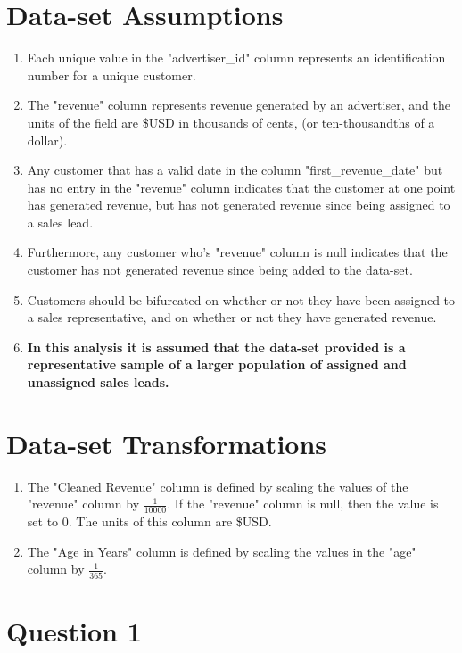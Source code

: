 \documentclass[11pt]{article}
\begin{document}
\section{Data-set Assumptions}
\begin{enumerate}
    \item Each unique value in the "advertiser\_id" column represents an identification number for a unique customer.
    \item The "revenue" column represents revenue generated by an advertiser, and the units of the field are \$USD in thousands of cents, (or ten-thousandths of a dollar).
    \item Any customer that has a valid date in the column "first\_revenue\_date" but has no entry in the "revenue" column indicates that the customer at one point has generated revenue, but has not generated revenue since being assigned to a sales lead. 
    \item Furthermore, any customer who's "revenue" column is null indicates that the customer has not generated revenue since being added to the data-set. 
    \item Customers should be bifurcated on whether or not they have been assigned to a sales representative, and on whether or not they have generated revenue.
    \item \textbf{In this analysis it is assumed that the data-set provided is a representative sample of a larger population of assigned and unassigned sales leads.} 
\end{enumerate}

\section{Data-set Transformations}
\begin{enumerate}
    \item The "Cleaned Revenue" column is defined by scaling the values of the "revenue" column by $\frac{1}{10000}$. If the "revenue" column is null, then the value is set to 0. The units of this column are \$USD.
    \item The "Age in Years" column is defined by scaling the values in the "age" column by $\frac{1}{365}$.
\end{enumerate}

\newpage

\section{Question 1}
\end{document}
